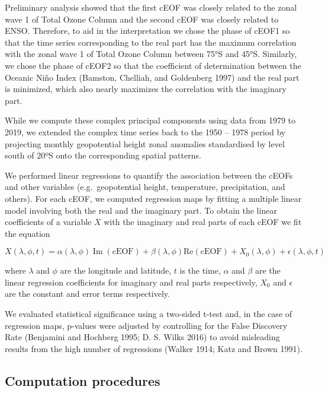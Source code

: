 \documentclass[smallextended]{svjour3}       %
\begin{document}
Preliminary analysis showed that the first cEOF was closely related to the zonal wave 1 of Total Ozone Column and the second cEOF was closely related to ENSO.
Therefore, to aid in the interpretation we chose the phase of cEOF1 so that the time series corresponding to the real part has the maximum correlation with the zonal wave 1 of Total Ozone Column between 75°S and 45°S.
Similarly, we chose the phase of cEOF2 so that the coefficient of determination between the Oceanic Niño Index (Bamston, Chelliah, and Goldenberg 1997) and the real part is minimized, which also nearly maximizes the correlation with the imaginary part.



While we compute these complex principal components using data from 1979 to 2019, we extended the complex time series back to the 1950 -- 1978 period by projecting monthly geopotential height zonal anomalies standardised by level south of 20ºS onto the corresponding spatial patterns.

We performed linear regressions to quantify the association between the cEOFs and other variables (e.g.~geopotential height, temperature, precipitation, and others).
For each cEOF, we computed regression maps by fitting a multiple linear model involving both the real and the imaginary part.
To obtain the linear coefficients of a variable \(X\) with the imaginary and real parts of each cEOF we fit the equation

\[
X(\lambda, \phi, t) = \alpha(\lambda, \phi) \operatorname{Im}(\mathrm{cEOF}) + \beta(\lambda, \phi) \mathrm{Re}(\mathrm{cEOF}) + X_0(\lambda, \phi) + \epsilon(\lambda, \phi, t)
\]

where \(\lambda\) and \(\phi\) are the longitude and latitude, \(t\) is the time, \(\alpha\) and \(\beta\) are the linear regression coefficients for imaginary and real parts respectively, \(X_0\) and \(\epsilon\) are the constant and error terms respectively.

We evaluated statistical significance using a two-sided t-test and, in the case of regression maps, p-values were adjusted by controlling for the False Discovery Rate (Benjamini and Hochberg 1995; D. S. Wilks 2016) to avoid misleading results from the high number of regressions (Walker 1914; Katz and Brown 1991).

\hypertarget{computation-procedures}{%
\subsection{Computation procedures}\label{computation-procedures}}
\end{document}
